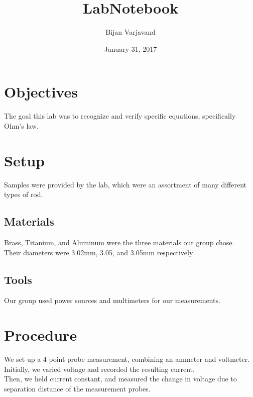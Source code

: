 \documentclass{article}
\author{Bijan Varjavand}
\title{LabNotebook}
\date{January 31, 2017}
\begin{document}
\maketitle

\section{Objectives}

The goal this lab was to recognize and verify specific equations, specifically Ohm's law.

\section{Setup}

Samples were provided by the lab, which were an assortment of many different types of rod.
\subsection{Materials}

Brass, Titanium, and Aluminum were the three materials our group chose.\\
Their diameters were 3.02mm, 3.05, and 3.05mm respectively
\subsection{Tools}

Our group used power sources and multimeters for our measurements.
\section{Procedure}

We set up a 4 point probe measurement, combining an ammeter and voltmeter.\\
Initially, we varied voltage and recorded the resulting current.\\
Then, we held current constant, and measured the change in voltage due to separation distance of the measurement probes.
\end{document}
